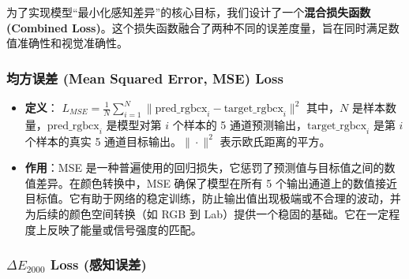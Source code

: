 为了实现模型“最小化感知差异”的核心目标，我们设计了一个\textbf{混合损失函数 (Combined Loss)}。这个损失函数融合了两种不同的误差度量，旨在同时满足数值准确性和视觉准确性。

\subsubsection[\hspace{-2pt}均方误差 (Mean Squared Error, MSE) Loss]{{\heiti{} \hspace{-8pt}均方误差 (Mean Squared Error, MSE) Loss}}\label{section2: MSE Loss}

\begin{itemize}
    \item \textbf{定义}：
    $ L_{MSE} = \frac{1}{N} \sum_{i=1}^N \| \text{pred\_rgbcx}_i - \text{target\_rgbcx}_i \|^2 $
    其中，$N$ 是样本数量，$\text{pred\_rgbcx}_i$ 是模型对第 $i$ 个样本的 5 通道预测输出，$\text{target\_rgbcx}_i$ 是第 $i$ 个样本的真实 5 通道目标输出。$\| \cdot \|^2$ 表示欧氏距离的平方。
    \item \textbf{作用}：MSE 是一种普遍使用的回归损失，它惩罚了预测值与目标值之间的数值差异。在颜色转换中，MSE 确保了模型在所有 5 个输出通道上的数值接近目标值。它有助于网络的稳定训练，防止输出值出现极端或不合理的波动，并为后续的颜色空间转换（如 RGB 到 Lab）提供一个稳固的基础。它在一定程度上反映了能量或信号强度的匹配。
\end{itemize}

\subsubsection[\hspace{-2pt}$\Delta E_{2000}$ Loss (感知误差)]{{\heiti{} \hspace{-8pt}$\Delta E_{2000}$ Loss (感知误差)}}\label{section2: Delta E 2000 Loss}

